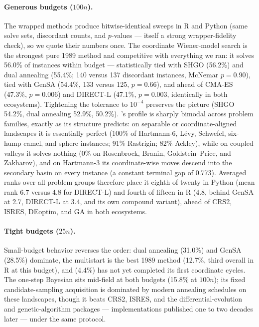 \paragraph{Generous budgets ($100n$).} The wrapped methods produce
bitwise-identical sweeps in R and Python (same solve sets, discordant
counts, and $p$-values --- itself a strong wrapper-fidelity check), so
we quote their numbers once. The coordinate Wiener-model search
 is the strongest pure 1989 method and competitive with
everything we ran: it solves 56.0\% of instances within budget ---
statistically tied with SHGO (56.2\%) and dual annealing (55.4\%; 140
versus 137 discordant instances, McNemar $p=0.90$), tied with GenSA
(54.4\%, 133 versus 125, $p=0.66$), and ahead of CMA-ES (47.3\%,
$p=0.006$) and DIRECT-L (47.1\%, $p=0.003$, identically in both
ecosystems). Tightening the tolerance to $10^{-4}$ preserves the
picture (SHGO 54.2\%, dual annealing 52.9\%,  50.2\%).
's profile is sharply bimodal across problem families,
exactly as its structure predicts: on separable or coordinate-aligned
landscapes it is essentially perfect (100\% of Hartmann-6, L\'evy,
Schwefel, six-hump camel, and sphere instances; 91\% Rastrigin; 82\%
Ackley), while on coupled valleys it solves nothing (0\% on
Rosenbrock, Branin, Goldstein--Price, and Zakharov), and on Hartmann-3
its coordinate-wise moves descend into the secondary basin on every
instance (a constant terminal gap of 0.773). Averaged ranks over all
problem groups therefore place it eighth of twenty in Python (mean
rank 6.7 versus 4.8 for DIRECT-L) and fourth of fifteen in R (4.8,
behind GenSA at 2.7, DIRECT-L at 3.4, and its own compound variant),
ahead of CRS2, ISRES, DEoptim, and GA in both ecosystems.

\paragraph{Tight budgets ($25n$).} Small-budget behavior reverses the
order: dual annealing (31.0\%) and GenSA (28.5\%) dominate, the
multistart  is the best 1989 method (12.7\%, third
overall in R at this budget), and  (4.4\%) has not yet
completed its first coordinate cycles. The one-step Bayesian
 sits mid-field at both budgets (15.8\% at $100n$); its
fixed candidate-sampling acquisition is dominated by modern annealing
schedules on these landscapes, though it beats CRS2, ISRES, and the
differential-evolution and genetic-algorithm packages ---
implementations published one to two decades later --- under the same
protocol.

